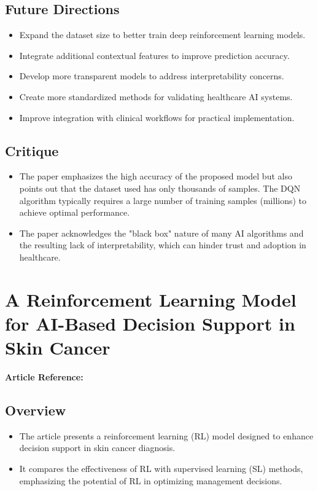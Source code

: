 \subsection*{Future Directions}
\begin{itemize}
    \item Expand the dataset size to better train deep reinforcement learning models.
    \item Integrate additional contextual features to improve prediction accuracy.
    \item Develop more transparent models to address interpretability concerns.
    \item Create more standardized methods for validating healthcare AI systems.
    \item Improve integration with clinical workflows for practical implementation.
\end{itemize}

\subsection*{Critique}
\begin{itemize}
    \item The paper emphasizes the high accuracy of the proposed model but also points out that the dataset used has only thousands of samples. The DQN algorithm typically requires a large number of training samples (millions) to achieve optimal performance.
    \item The paper acknowledges the "black box" nature of many AI algorithms and the resulting lack of interpretability, which can hinder trust and adoption in healthcare.
\end{itemize}
\section{A Reinforcement Learning Model for AI-Based Decision Support in Skin Cancer}
\textbf{Article Reference:} \cite{article_11}

\subsection*{Overview}
\begin{itemize}
    \item The article presents a reinforcement learning (RL) model designed to enhance decision support in skin cancer diagnosis.
    \item It compares the effectiveness of RL with supervised learning (SL) methods, emphasizing the potential of RL in optimizing management decisions.
\end{itemize}

